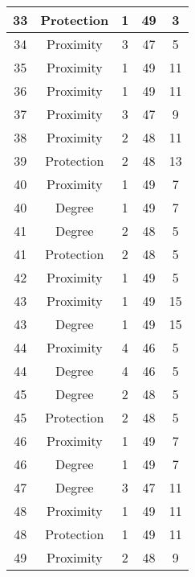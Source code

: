 \documentclass[results.tex]{subfiles}
\begin{document}
\begin{center}
\begin{tabular}{| c || c | c | c | c |}
    33 & Protection & 1 & 49 & 3 \\ 
    \hline
    34 & Proximity & 3 & 47 & 5 \\ 
    \hline
    35 & Proximity & 1 & 49 & 11 \\ 
    \hline
    36 & Proximity & 1 & 49 & 11 \\ 
    \hline
    37 & Proximity & 3 & 47 & 9 \\ 
    \hline
    38 & Proximity & 2 & 48 & 11 \\ 
    \hline
    39 & Protection & 2 & 48 & 13 \\ 
    \hline
    40 & Proximity & 1 & 49 & 7 \\ 
    \hline
    40 & Degree & 1 & 49 & 7 \\ 
    \hline
    41 & Degree & 2 & 48 & 5 \\ 
    \hline
    41 & Protection & 2 & 48 & 5 \\ 
    \hline
    42 & Proximity & 1 & 49 & 5 \\ 
    \hline
    43 & Proximity & 1 & 49 & 15 \\ 
    \hline
    43 & Degree & 1 & 49 & 15 \\ 
    \hline
    44 & Proximity & 4 & 46 & 5 \\ 
    \hline
    44 & Degree & 4 & 46 & 5 \\ 
    \hline
    45 & Degree & 2 & 48 & 5 \\ 
    \hline
    45 & Protection & 2 & 48 & 5 \\ 
    \hline
    46 & Proximity & 1 & 49 & 7 \\ 
    \hline
    46 & Degree & 1 & 49 & 7 \\ 
    \hline
    47 & Degree & 3 & 47 & 11 \\ 
    \hline
    48 & Proximity & 1 & 49 & 11 \\ 
    \hline
    48 & Protection & 1 & 49 & 11 \\ 
    \hline
    49 & Proximity & 2 & 48 & 9 \\ 
    \hline   \end{tabular}
\end{center}
\end{document}
